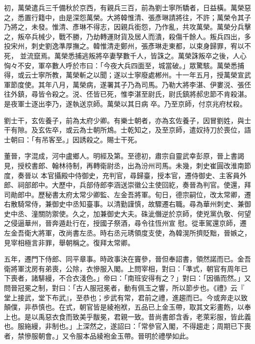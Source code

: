 \begin{pinyinscope}
 初，萬榮遣兵三千備秋於京西，有親兵三百，前為劉士寧所驕者，日益橫。萬榮惡之，悉置行籍中，由是深怨萬榮。大將韓惟清、張彥琳請將往，不許；萬榮令其子乃將之，未發。惟清、彥琳不得志，因親兵銜怨，乃作亂，共攻萬榮。萬榮分兵擊之，叛卒兵械少，戰不勝，乃劫轉運財貨及居人而潰，殺傷千餘人。叛兵四出，多投宋州，刺史劉逸準厚撫之。韓惟清走鄭州，張彥琳走東都，以束身歸罪，宥以不死，
 並流竄焉。萬榮悉捕逃叛將卒妻孥數千人，皆誅之。萬榮誅叛卒之後，人心恟々不安，軍卒數人呼於市曰：「今夜大兵四面至，城當破。」眾驚駭。萬榮悉捕得，或云士寧所教，萬榮斬之以聞；遂以士寧廢處郴州。十一年五月，授萬榮宣武軍節度使。其年八月，萬榮病，遂署其子乃為司馬。乃勒大將李湛、伊婁涚、張伾往外鎮，尋皆令殺之。涚、伾皆已死，惟李湛至尉氏，尉氏鎮將郝忠節不肯殺湛。是夜軍士逐出李乃，遂執送京師。萬榮以其日病
 卒。乃至京師，付京兆府杖殺。



 劉士干，玄佐養子，前為太府少卿。有樂士朝者，亦為玄佐養子，因冒劉姓，與士干有隙。及玄佐卒，或云為士朝所鴆。士乾知之，及至京師，遣奴持刀於喪位，語士朝曰：「有吊客至。」因誘殺之。賜士干死。



 董晉，字混成，河中盧鄉人。明經及第。至德初，肅宗自靈武幸彭原，晉上書謁見，授校書郎、翰林待制，再轉衛尉丞，出為汾州司馬。未幾，刺史崔圓改淮南節度，奏晉以
 本官攝殿中侍御史，充判官，尋歸臺，授本官，遷侍御史、主客員外郎、祠部郎中。大歷中，兵部侍郎李涵送崇徽公主使回紇，奏晉為判官。使還，拜司勛郎中。歷秘書太府太常少卿監、左金吾將軍。旬日，德宗嗣位，改太常卿，遷右散騎常侍，兼御史中丞知臺事。以清勤謹慎，故驟遷右職。尋為華州刺史、兼御史中丞、潼關防禦使。久之，加兼御史大夫。硃泚僭逆於京師，使兇黨仇敬、何望之侵逼華州，晉奔遁赴行在，授國子祭酒，尋令往恆州宣
 慰。從車駕還京師，遷左金吾衛大將軍，改尚書左丞。時右丞元琇領度支使，為韓滉所擠貶黜，晉嫉之，見宰相極言非罪，舉朝稱之。復拜太常卿。



 五年，遷門下侍郎、同平章事。時政事決在竇參，晉但奉詔書，領然諾而已。金吾衛將軍沈房有弟喪，公除，衣慘服入閣。上問宰相，對曰：「準式，朝官有周年已下喪者，諸騑縵，不合衣淺色。」帝曰：「南班安得有之？」對曰：「因循而然。」又問晉冠冕之制，對曰：「古人服冠冕者，動有佩玉之響，所以節步也。《禮》云『
 堂上接武，堂下布武』，至恭也；步武有常，君前之禮，進趨而已。今或奔走以致顛僕，非恭慎也。在式，朝官皆是綾袍袱，五品已上金玉帶，取其文彩畫飭，以奉上也。是以禹惡衣食而致美乎黻冕，君親一致。昔尚書郎含香，老萊彩服，皆此義也。服絁縵，非制也。」上深然之，遂詔曰：「常參官入閣，不得趨走；周期已下喪者，禁慘服朝會。」又令服本品綾袍金玉帶。晉明於禮學如此。




\end{pinyinscope}

